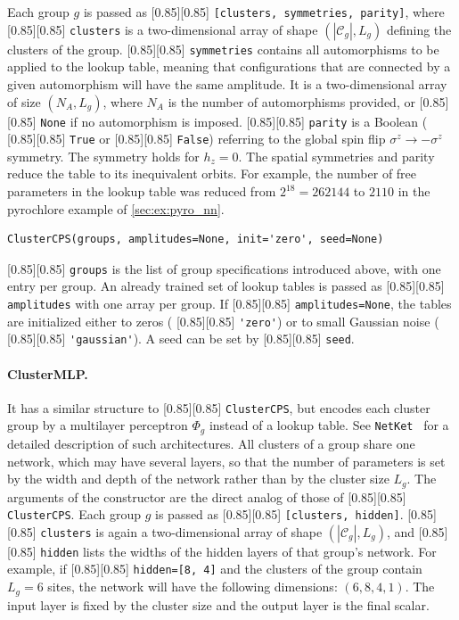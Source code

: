 \documentclass{SciPost}
\newcommand{\pyinline}[1]{\begingroup\setlength{\fboxsep}{0pt}%
  \colorbox{gray!15}{\raisebox{0pt}[0.85\ht\strutbox][0.85\dp\strutbox]{%
    \hspace{1pt}\lstinline{#1}\hspace{1pt}}}\endgroup}
\begin{document}
Each group $g$ is passed as \pyinline{[clusters, symmetries, parity]}, where \pyinline{clusters} is a two-dimensional array of shape $(|\mathcal{C}_g|, L_g)$ defining the clusters of the group. 
%
\pyinline{symmetries} contains all automorphisms to be applied to the lookup table, meaning that configurations that are connected by a given automorphism will have the same amplitude.
%
It is a two-dimensional array of size $(N_A,L_g)$, where $N_A$ is the number of automorphisms provided, or \pyinline{None} if no automorphism is imposed.
%
\pyinline{parity} is a Boolean (\pyinline{True} or \pyinline{False}) referring to the global spin flip $\sigma^z\to-\sigma^z$ symmetry.
%
The symmetry holds for $h_z=0$.
%
The spatial symmetries and parity reduce the table to its inequivalent orbits.
%
For example, the number of free parameters in the lookup table was reduced from $2^{18}=262144$ to $2110$ in the pyrochlore example of \autoref{sec:ex:pyro_nn}.\\


\begin{lstlisting}
ClusterCPS(groups, amplitudes=None, init='zero', seed=None)
\end{lstlisting}


\pyinline{groups} is the list of group specifications introduced above, with one entry per group.
%
An already trained set of lookup tables is passed as \pyinline{amplitudes} with one array per group.
%
If \pyinline{amplitudes=None}, the tables are initialized either to zeros (\pyinline{'zero'}) or to small Gaussian noise (\pyinline{'gaussian'}).
%
A seed can be set by \pyinline{seed}.

\paragraph{ClusterMLP.}
It has a similar structure to \pyinline{ClusterCPS}, but encodes each cluster group by a multilayer perceptron $\Phi_g$ instead of a lookup table.
%
See \texttt{NetKet}~\cite{SciPostPhysCodeb.7,SciPostPhysCodeb.7-r3.4} for a detailed description of such architectures.
%
All clusters of a group share one network, which may have several layers, so that the number of parameters is set by the width and depth of the network rather than by the cluster size $L_g$.
%
The arguments of the constructor are the direct analog of those of \pyinline{ClusterCPS}.
%
Each group $g$ is passed as \pyinline{[clusters, hidden]}.
%
\pyinline{clusters} is again a two-dimensional array of shape $(|\mathcal{C}_g|, L_g)$, and \pyinline{hidden} lists the widths of the hidden layers of that group's network.
%
For example, if \pyinline{hidden=[8, 4]} and the clusters of the group contain $L_g=6$ sites, the network will have the following dimensions: $(6, 8, 4, 1)$.
%
The input layer is fixed by the cluster size and the output layer is the final scalar.
\end{document}
